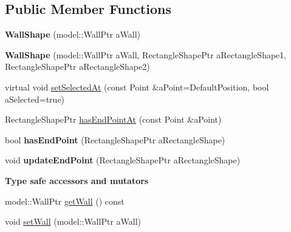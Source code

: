 \subsection*{Public Member Functions}
\begin{DoxyCompactItemize}
\item 
{\bfseries Wall\+Shape} (model\+::\+Wall\+Ptr a\+Wall)\hypertarget{class_view_1_1_wall_shape_a79daa25e2a0c2cc670569fd071c95d25}{}\label{class_view_1_1_wall_shape_a79daa25e2a0c2cc670569fd071c95d25}

\item 
{\bfseries Wall\+Shape} (model\+::\+Wall\+Ptr a\+Wall, Rectangle\+Shape\+Ptr a\+Rectangle\+Shape1, Rectangle\+Shape\+Ptr a\+Rectangle\+Shape2)\hypertarget{class_view_1_1_wall_shape_a4056d010b2966b184a722eacbf97cf83}{}\label{class_view_1_1_wall_shape_a4056d010b2966b184a722eacbf97cf83}

\item 
virtual void \hyperlink{class_view_1_1_wall_shape_afb594e5259f6ce9c57fc6516db138716}{set\+Selected\+At} (const Point \&a\+Point=Default\+Position, bool a\+Selected=true)
\item 
Rectangle\+Shape\+Ptr \hyperlink{class_view_1_1_wall_shape_ac53998b44692cb6d51e57db6d32b9fa2}{has\+End\+Point\+At} (const Point \&a\+Point)
\item 
bool {\bfseries has\+End\+Point} (Rectangle\+Shape\+Ptr a\+Rectangle\+Shape)\hypertarget{class_view_1_1_wall_shape_a75b8d2472e424677fb2b3eec03e62273}{}\label{class_view_1_1_wall_shape_a75b8d2472e424677fb2b3eec03e62273}

\item 
void {\bfseries update\+End\+Point} (Rectangle\+Shape\+Ptr a\+Rectangle\+Shape)\hypertarget{class_view_1_1_wall_shape_aac9b0aacd63e785094059297b12689fe}{}\label{class_view_1_1_wall_shape_aac9b0aacd63e785094059297b12689fe}

\end{DoxyCompactItemize}
\begin{Indent}{\bf Type safe accessors and mutators}\par
\begin{DoxyCompactItemize}
\item 
model\+::\+Wall\+Ptr \hyperlink{class_view_1_1_wall_shape_a61554729a6afeececccff6ad23bf0924}{get\+Wall} () const
\item 
void \hyperlink{class_view_1_1_wall_shape_a0b34f9a058db38586162d63c3950b6d0}{set\+Wall} (model\+::\+Wall\+Ptr a\+Wall)
\end{DoxyCompactItemize}
\end{Indent}
